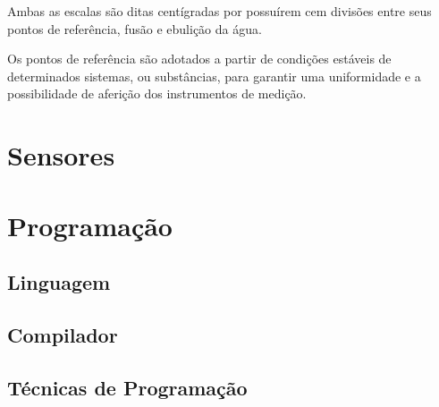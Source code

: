 Ambas as escalas são ditas centígradas por possuírem cem divisões entre seus pontos de referência, fusão e ebulição da água.

Os pontos de referência são adotados a partir de condições estáveis de determinados sistemas, ou substâncias, para garantir uma uniformidade e a possibilidade de aferição dos instrumentos de medição.



\section{Sensores}
\section{Programação}
\subsection{Linguagem}
\subsection{Compilador}
\subsection{Técnicas de Programação}

